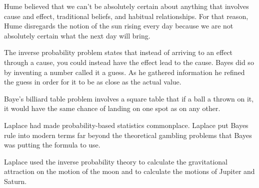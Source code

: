 \documentclass[12pt]{article}
\begin{document}

\begin{enumerate}


Hume believed that we can't be absolutely certain about anything that involves cause and effect, traditional beliefs, and habitual relationships. For that reason, Hume disregards the notion of the sun rising every day because we are not absolutely certain what the next day will bring. 

The inverse probability problem states that instead of arriving to an effect through a cause, you could instead have the effect lead to the cause. Bayes did so by inventing a number called it a guess. As he gathered information he refined the guess in order for it to be as close as the actual value. 


Baye's billiard table problem involves a square table that if a ball a thrown on it, it would have the same chance of landing on one spot as on any other. 

 


Laplace had made probability-based statistics commonplace. Laplace put Bayes rule into modern terms far beyond the theoretical gambling problems that Bayes was putting the formula to use. 



Laplace used the inverse probability theory to calculate the gravitational attraction on the motion of the moon and to calculate the motions of Jupiter and Saturn. 

 




\end{enumerate}
\end{document}
